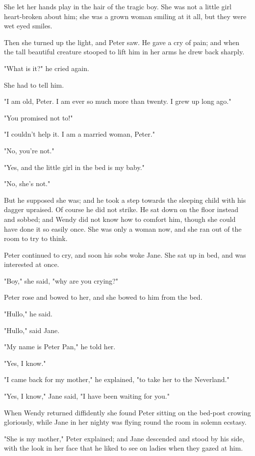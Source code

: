 She let her hands play in the hair of the tragic boy. She was not a little
girl heart-broken about him; she was a grown woman smiling at it all, but
they were wet eyed smiles.


Then she turned up the light, and Peter saw. He gave a cry of pain; and
when the tall beautiful creature stooped to lift him in her arms he drew
back sharply.


"What is it?" he cried again.


She had to tell him.


"I am old, Peter. I am ever so much more than twenty. I grew up long ago."


"You promised not to!"


"I couldn't help it. I am a married woman, Peter."


"No, you're not."


"Yes, and the little girl in the bed is my baby."


"No, she's not."


But he supposed she was; and he took a step towards the sleeping child
with his dagger upraised. Of course he did not strike. He sat down on the
floor instead and sobbed; and Wendy did not know how to comfort him,
though she could have done it so easily once. She was only a woman now,
and she ran out of the room to try to think.


Peter continued to cry, and soon his sobs woke Jane. She sat up in bed,
and was interested at once.


"Boy," she said, "why are you crying?"


Peter rose and bowed to her, and she bowed to him from the bed.


"Hullo," he said.


"Hullo," said Jane.


"My name is Peter Pan," he told her.


"Yes, I know."


"I came back for my mother," he explained, "to take her to the Neverland."


"Yes, I know," Jane said, "I have been waiting for you."


When Wendy returned diffidently she found Peter sitting on the bed-post
crowing gloriously, while Jane in her nighty was flying round the room in
solemn ecstasy.


"She is my mother," Peter explained; and Jane descended and stood by his
side, with the look in her face that he liked to see on ladies when they
gazed at him.


